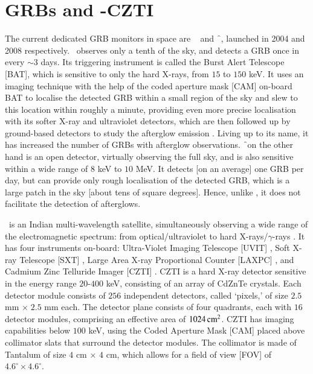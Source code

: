 \section{GRBs and \AS-CZTI}
\label{sec:GRBs_and_AstroSat}
The current dedicated GRB monitors in space are \s\ \citep{Gehrels_et_al.-2004-ApJ} and \f\ \citep{FermiGBM-2009-ApJ}, launched in 2004 and 2008 respectively. \s\ observes only a tenth of the sky, and detects a GRB once in every $\sim 3$ days. Its triggering instrument is called the Burst Alert Telescope [BAT], which is sensitive to only the hard X-rays, from $15$ to $150$ keV. It uses an imaging technique with the help of the coded aperture mask [CAM] on-board BAT to localise the detected GRB within a small region of the sky and slew to this location within roughly a minute, providing even more precise localisation with its softer X-ray and ultraviolet detectors, which are then followed up by ground-based detectors to study the afterglow emission \citep{Barthelmy_et_al.-2005-SSRv-SwiftBAT, Band-2006-ApJ}. Living up to its name, it has increased the number of GRBs with afterglow observations. \f\ on the other hand is an open detector, virtually observing the full sky, and is also sensitive within a wide range of $8$ keV to $10$ MeV. It detects [on an average] one GRB per day, but can provide only rough localisation of the detected GRB, which is a large patch in the sky [about tens of square degrees]. Hence, unlike \s, it does not facilitate the detection of afterglows.

\AS\ is an Indian multi-wavelength satellite, simultaneously observing a wide range of the electromagnetic spectrum: from optical/ultraviolet to hard X-rays/$\gamma$-rays \citep{Rao_et_al.-2016-arXiv-Astrosat}. It has four instruments on-board: Ultra-Violet Imaging Telescope [UVIT] \citep{Subramaniam_et_al.-2016-SPIE, Tandon_et_al.-2017-AJ, Tandon_et_al.-2017-JApA, Rahna_et_al.-2017-MNRAS}, Soft X-ray Telescope [SXT] \citep{Singh_et_al.-2016-SPIE, Singh_et_al.-2017-JApA}, Large Area X-ray Proportional Counter [LAXPC] \citep{Agrawal_et_al.-2017-JApA, Antia_et_al.-2017-ApJS, Yadav_et_al.-2017-arXiv}, and Cadmium Zinc Telluride Imager [CZTI] \citep{Bhalerao_et_al.-2017-JApA}. CZTI is a hard X-ray detector sensitive in the energy range $20$-$400$ keV, consisting of an array of CdZnTe crystals. Each detector module consists of $256$ independent detectors, called `pixels,' of size $2.5$ mm $\times \; 2.5$ mm each. The detector plane consists of four quadrants, each with $16$ detector modules, comprising an effective area of $1024 \, \rm{cm{^2}}$. CZTI has imaging capabilities below $100$ keV, using the Coded Aperture Mask [CAM] placed above collimator slats that surround the detector modules. The collimator is made of Tantalum of size $4$ cm $\times$ $4$ cm, which allows for a field of view [FOV] of $4.6^{\circ} \times 4.6^{\circ}$.

